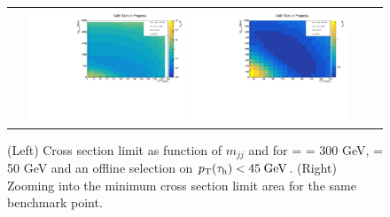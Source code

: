 \begin{figure}[tbh!]
	\centering
	\begin{tabular}{cc}
		\includegraphics[width=0.45\textwidth]{analysis/pics/JetInvMass_vs_MET_xsec_chi300_lsp050_taupt45.pdf}
		\includegraphics[width=0.45\textwidth]{analysis/pics/JetInvMass_vs_MET_xsec_chi300_lsp050_taupt45_zoom.pdf} 		
	\end{tabular}
	\caption{(Left) Cross section limit as function of $m_{jj}$ and \met for \charginopm = \neutralinotwo = 300 GeV, \neutralinoone = 50 GeV and an offline selection on $p_{\text{T}}(\tau_{\text{h}}) <  45\;\text{Ge}\kern-0.06667em\text{V}$. (Right) Zooming into the minimum cross section limit area for the same benchmark point.}
	\label{fig::JetInvMass_vs_MET_xsec_chi300_lsp050_taupt45}
\end{figure}

\FloatBarrier

